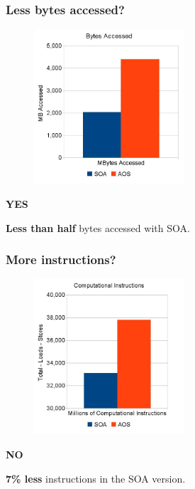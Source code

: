 \documentclass{beamer}
\begin{document}
\begin{frame}
	\frametitle{Less bytes accessed?}
	\begin{multicols}{2}
		\begin{figure}
			\begin{center}
				\includegraphics[width=0.5\textwidth]{images/slides.april/bytes.jpg}
			\end{center}
		\end{figure}
		
		\begin{center}
			\huge\bfseries YES
		\end{center}
		
		\textbf{Less than half} bytes accessed with SOA.
	\end{multicols}
\end{frame}

\begin{frame}
	\frametitle{More instructions?}
	\begin{multicols}{2}
		\begin{figure}
			\begin{center}
				\includegraphics[width=0.5\textwidth]{images/slides.april/instructions.jpg}
			\end{center}
		\end{figure}
				
		\begin{center}
			\huge\bfseries NO
		\end{center}
		
		\textbf{7\% less} instructions in the SOA version.
	\end{multicols}
\end{frame}
\end{document}
